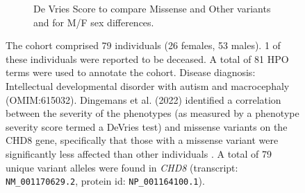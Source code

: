 \begin{figure}[htbp]
\vspace{2em}

\begin{subfigure}[b]{0.95\textwidth}
\captionsetup{justification=raggedright,singlelinecheck=false}
\caption{De Vries Score to compare Missense and Other variants and for M/F sex differences. }
\end{subfigure}


\vspace{2em}

\caption{ The cohort comprised 79 individuals (26 females, 53 males). 1 of these individuals were reported to be deceased. 
A total of 81 HPO terms were used to annotate the cohort. Disease diagnosis: Intellectual developmental disorder with autism and macrocephaly 
(OMIM:615032).  Dingemans et al. (2022) identified a correlation between the severity of the phenotypes (as measured by a phenotype severity score termed a DeVries test) and missense variants on the CHD8 gene, 
specifically that those with a missense variant were significantly less affected than other individuals \cite{PMID_36182950}.
A total of 79 unique variant alleles were found in \textit{CHD8} (transcript: \texttt{NM\_001170629.2}, protein id: \texttt{NP\_001164100.1}).}
\end{figure}

